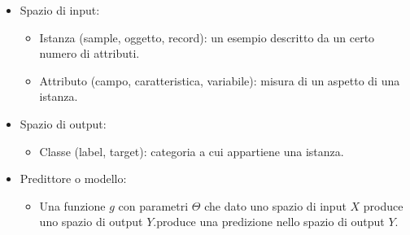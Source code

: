 \documentclass{../main.tex}[subfiles]
\begin{document}
\begin{itemize}
	\item Spazio di input:
	\begin{itemize}
		\item Istanza (sample, oggetto, record): un esempio descritto da un certo numero di attributi.
		\item Attributo (campo, caratteristica, variabile): misura di un aspetto di una istanza.
	
	\end{itemize}
	\item Spazio di output:
	\begin{itemize}
		\item Classe (label, target): categoria a cui appartiene una istanza.
	\end{itemize}
	\item Predittore o modello:
	\begin{itemize}
		\item Una funzione $g$ con parametri $\Theta$ che dato uno spazio di input $X$ produce uno spazio di output $Y$.produce una predizione nello spazio di output $Y$.
	\end{itemize}
\end{itemize}
\end{document}
